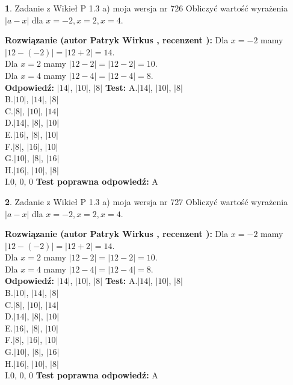 \documentclass[12pt, a4paper]{article}
\theoremstyle{definition} %
\newtheorem{zad}{}
\newcommand{\zadStart}[1]{\begin{zad}#1\newline}
\newcommand{\zadStop}{\end{zad}}
\newcommand{\rozwStart}[2]{\noindent \textbf{Rozwiązanie (autor #1 , recenzent #2): }\newline}
\newcommand{\rozwStop}{\newline}
\newcommand{\odpStart}{\noindent \textbf{Odpowiedź:}\newline}
\newcommand{\odpStop}{\newline}
\newcommand{\testStart}{\noindent \textbf{Test:}\newline}
\newcommand{\testStop}{\newline}
\newcommand{\kluczStart}{\noindent \textbf{Test poprawna odpowiedź:}\newline}
\newcommand{\kluczStop}{\newline}
\begin{document}
\zadStart{Zadanie z Wikieł P 1.3 a) moja wersja nr 726}
Obliczyć wartość wyrażenia $|a - x|$ dla $x=-2,x=2,x=4$.
\zadStop
\rozwStart{Patryk Wirkus}{}
Dla $x = -2$ mamy $|12 - (-2)| = |12 + 2| = 14$.\\
Dla $x = 2$ mamy $|12 - 2| = |12 - 2| = 10$.\\
Dla $x = 4$ mamy $|12 - 4| = |12 - 4| = 8$.\\
\rozwStop
\odpStart
$|14|$, $|10|$, $|8|$
\odpStop
\testStart
A.$|14|$, $|10|$, $|8|$\\
B.$|10|$, $|14|$, $|8|$\\
C.$|8|$, $|10|$, $|14|$\\
D.$|14|$, $|8|$, $|10|$\\
E.$|16|$, $|8|$, $|10|$\\
F.$|8|$, $|16|$, $|10|$\\
G.$|10|$, $|8|$, $|16|$\\
H.$|16|$, $|10|$, $|8|$\\
I.$0$, $0$, $0$
\testStop
\kluczStart
A
\kluczStop



\zadStart{Zadanie z Wikieł P 1.3 a) moja wersja nr 727}
Obliczyć wartość wyrażenia $|a - x|$ dla $x=-2,x=2,x=4$.
\zadStop
\rozwStart{Patryk Wirkus}{}
Dla $x = -2$ mamy $|12 - (-2)| = |12 + 2| = 14$.\\
Dla $x = 2$ mamy $|12 - 2| = |12 - 2| = 10$.\\
Dla $x = 4$ mamy $|12 - 4| = |12 - 4| = 8$.\\
\rozwStop
\odpStart
$|14|$, $|10|$, $|8|$
\odpStop
\testStart
A.$|14|$, $|10|$, $|8|$\\
B.$|10|$, $|14|$, $|8|$\\
C.$|8|$, $|10|$, $|14|$\\
D.$|14|$, $|8|$, $|10|$\\
E.$|16|$, $|8|$, $|10|$\\
F.$|8|$, $|16|$, $|10|$\\
G.$|10|$, $|8|$, $|16|$\\
H.$|16|$, $|10|$, $|8|$\\
I.$0$, $0$, $0$
\testStop
\kluczStart
A
\kluczStop
\end{document}
